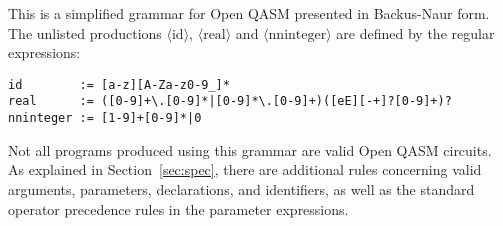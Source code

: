 \documentclass[USenglish,12pt,fleqn]{article} %
\begin{document}
This is a simplified grammar for Open QASM presented in Backus-Naur form. The unlisted productions $\langle\mathrm{id}\rangle$, $\langle\mathrm{real}\rangle$ and $\langle\mathrm{nninteger}\rangle$ are defined by the regular expressions:
\begin{verbatim}
id        := [a-z][A-Za-z0-9_]*
real      := ([0-9]+\.[0-9]*|[0-9]*\.[0-9]+)([eE][-+]?[0-9]+)?
nninteger := [1-9]+[0-9]*|0
\end{verbatim}
Not all programs produced using this grammar are valid Open QASM circuits. As explained in Section~\ref{sec:spec}, there are additional rules concerning valid arguments, parameters, declarations, and identifiers, as well as the standard operator precedence rules in the parameter expressions.
             


\end{document}
